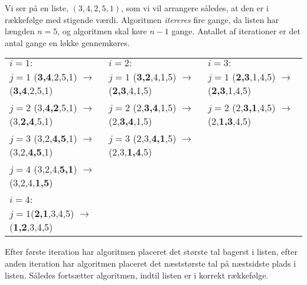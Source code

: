 \begin{exmp}
Vi ser på en liste, $(3,4,2,5,1)$, som vi vil arrangere således, at den er i rækkefølge med stigende værdi. Algoritmen \emph{itereres} fire gange, da listen har længden $n=5$, og algoritmen skal køre $n-1$ gange. Antallet af iterationer er det antal gange en løkke gennemkøres.

\begin{flushleft}
\begin{tabular}{l l l}
$i=1:$ & $i=2:$ & $i=3:$ \\ 
$j=1$ (\textbf{3,4},2,5,1) $\rightarrow$ (\textbf{3,4},2,5,1) & $j=1$ (\textbf{3,2},4,1,5) $\rightarrow$ (\textbf{2,3},4,1,5) & $j=1$ (\textbf{2,3},1,4,5) $\rightarrow$ (\textbf{2,3},1,4,5) \\  
$j=2$ (3,\textbf{4,2},5,1) $\rightarrow$ (3,\textbf{2,4},5,1)  & $j=2$ (2,\textbf{3,4},1,5) $\rightarrow$ (2,\textbf{3,4},1,5) & $j=2$ (2,\textbf{3,1},4,5) $\rightarrow$ (2,\textbf{1,3},4,5) \\
$j=3$ (3,2,\textbf{4,5},1) $\rightarrow$ (3,2,\textbf{4,5},1) & $j=3$ (2,3,\textbf{4,1},5) $\rightarrow$ (2,3,\textbf{1,4},5) & \\
$j=4$ (3,2,4,\textbf{5,1}) $\rightarrow$ (3,2,4,\textbf{1,5}) & & \\
& &  \\
$i=4:$ & & \\
$j=1$(\textbf{2,1},3,4,5) $\rightarrow$ (\textbf{1,2},3,4,5) & &
\end{tabular}
\end{flushleft}



Efter første iteration  har algoritmen placeret det største tal bagerst i listen, efter anden iteration har algoritmen placeret det næststørste tal på næstsidste plads i listen. Således fortsætter algoritmen, indtil listen er i korrekt rækkefølge.

\end{exmp}